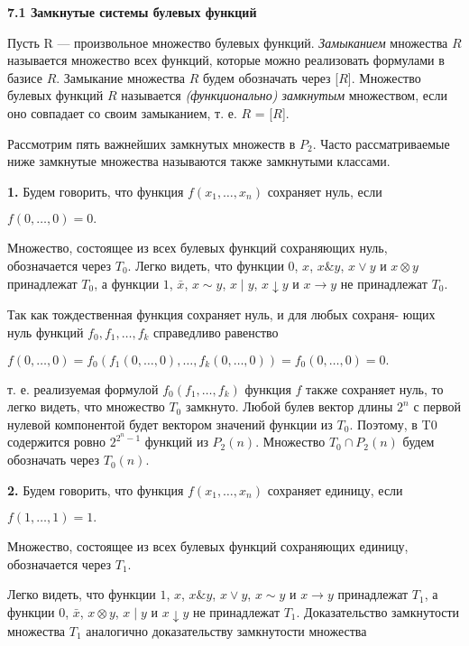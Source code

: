 \documentclass[10pt]{article}
\begin{document}
\begin{flushleft}
\bf{7.1 \quad Замкнутые системы булевых функций}
\end{flushleft}
Пусть R — произвольное множество булевых функций. \textit{Замыканием} множества $R$
называется множество всех функций, которые можно реализовать
формулами в базисе $R$. Замыкание множества $R$ будем обозначать через [$R$].
Множество булевых функций $R$ называется \textit{(функционально) замкнутым}
множеством, если оно совпадает со своим замыканием, т. е. $R$ = [$R$]. \par
Рассмотрим пять важнейших замкнутых множеств в $P_2$. Часто рассматриваемые ниже замкнутые
множества называются также замкнутыми классами.\par
{\bf{1.}} Будем говорить, что функция $f(x_1,\dots,x_n)$ сохраняет нуль, если
\begin{center} $f(0,\dots, 0) = 0.$ \end{center}
Множество, состоящее из всех булевых функций сохраняющих нуль, обозначается
через $T_0$. Легко видеть, что функции $0$, $x$, $x\& y$, $x \vee y$ и $x \otimes y$
принадлежат $T_0$, а функции $1$, $\bar x$, $x \sim y$, $x \mid y$, $x \downarrow y$ и $x \to y$
 не принадлежат $T_0$. \par
Так как тождественная функция сохраняет нуль, и для любых сохраня-
ющих нуль функций ${f_0, f_1, \dots,f_k}$ справедливо равенство
\begin{center} $f(0, \dots, 0) = f_0(f_1(0, \dots, 0), \dots,f_k(0, \dots, 0)) = f_0(0, \dots, 0) = 0.$\end{center}
т. е. реализуемая формулой $f_0(f_1, \dots,f_k)$ функция $f$ также сохраняет нуль,
то легко видеть, что множество $T_0$ замкнуто.
Любой булев вектор длины $2^n$ с первой нулевой компонентой будет вектором
значений функции из $T_0$. Поэтому, в T0 содержится ровно $2^{2^n−1}$ функций
из $P_{2}(n)$. Множество $T_0 \cap P_{2}(n)$ будем обозначать через $T_{0}(n)$. \par
{\bf{2.}} Будем говорить, что функция $f(x_1, \dots,x_n)$ сохраняет единицу, если
\begin{center} $f(1, \dots, 1) = 1.$\end{center}
Множество, состоящее из всех булевых функций сохраняющих единицу,
обозначается через $T_1$.
\newpage \par
Легко видеть, что функции $1$, $x$, $x\&y$, $x \vee y$, $x \sim y$ и $x \to y$ принадлежат
$T_1$, а функции $0$, $\bar x$, $x \otimes y$, $x \mid y$ и $x \downarrow y$ не принадлежат $T_1$. Доказательство
замкнутости множества $T_1$ аналогично доказательству замкнутости множества
\end{document}
